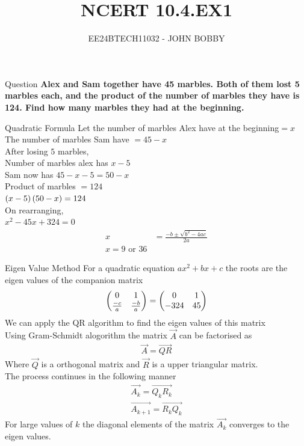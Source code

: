 \documentclass{beamer}
\begin{document}
\title{NCERT 10.4.EX1}
\author{EE24BTECH11032 - JOHN BOBBY}
\date{}
\frame{\titlepage}
\begin{frame}{Question}
\textbf{Alex and Sam together have 45 marbles. Both of them lost 5 marbles each, and the product of the number of marbles they have is 124. Find how many marbles they had at the beginning.}
\end{frame}
\begin{frame}{Quadratic Formula}
Let  the number of marbles Alex have at the beginning$=x$\\
The number of marbles Sam have $=45-x$\\
After losing $5$ marbles,\\
Number of marbles alex has $x-5$\\
Sam now has $45-x-5=50-x$\\
Product of marbles $=124$\\
$\left(x-5\right)\left(50-x\right)=124$\\
On rearranging,\\
$x^2-45x+324=0$\\
\begin{align*}
    x &= \frac{-b \pm \sqrt{b^2 - 4ac}}{2a}  \\ 
    x=9\text{ or }36
\end{align*}
\end{frame}
\begin{frame}{Eigen Value Method}
    For a quadratic equation $ax^2+bx+c$ the roots are the eigen values of the companion matrix \\
    $$\begin{pmatrix}0 & 1\\ \frac{-c}{a} & \frac{-b}{a}\end{pmatrix}=\begin{pmatrix} 0 & 1 \\-324 & 45\end{pmatrix}$$
    We can apply the QR algorithm to find the eigen values of this matrix\\
    Using Gram-Schmidt alogorithm  the matrix $\vec{A}$ can be factorised as \\
    \begin{align*}
        \vec{A}=\vec{QR}
    \end{align*}
    Where $\vec{Q}$ is a orthogonal matrix and $\vec{R}$ is a upper triangular matrix.\\
    The process continues in the following manner
    \begin{align*}
        \vec{A_k}=\vec{Q_kR_k}\\
        \vec{A_{k+1}}=\vec{R_kQ_k}
    \end{align*}
    For large values of $k$ the diagonal elements of the  matrix $\vec{A_k}$ converges to the eigen values. 
\end{frame}
\end{document}
